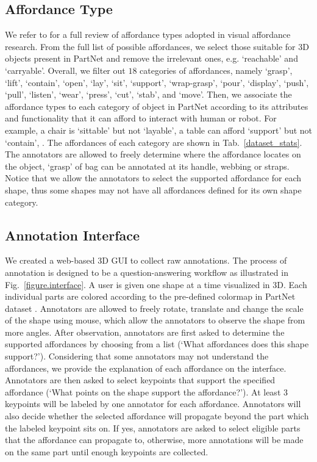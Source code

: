 \documentclass[final]{cvpr}
\begin{document}
 

\subsection{Affordance Type}
We refer to \cite{hassanin2018visual} for a full review of affordance types adopted in visual affordance research. From the full list of possible affordances, we select those suitable for 3D objects present in PartNet \cite{mo2019partnet} and remove the irrelevant ones, e.g. `reachable' and `carryable'. Overall, we filter out $18$ categories of affordances, namely `grasp', `lift', `contain', `open', `lay', `sit', `support', `wrap-grasp', `pour', `display', `push', `pull', `listen', `wear', `press', `cut', `stab', and `move'. Then, we associate the affordance types to each category of object in PartNet according to its attributes and functionality that it can afford to interact with human or robot. For example, a chair is `sittable' but not `layable', a table can afford `support' but not `contain', \etc. The affordances of each category are shown in Tab.~\ref{dataset_stats}. The annotators are allowed to freely determine where the affordance locates on the object, \eg `grasp' of bag can be annotated at its handle, webbing or straps. Notice that we allow the annotators to select the supported affordance for each shape, thus some shapes may not have all affordances defined for its own shape category. 





\subsection{Annotation Interface}

We created a web-based 3D GUI to collect raw annotations. The process of annotation is designed to be a question-answering workflow as illustrated in Fig.~\ref{figure.interface}. A user is given one shape at a time visualized in 3D. Each individual parts are colored according to the pre-defined colormap in PartNet dataset \cite{mo2019partnet}. Annotators are allowed to freely rotate, translate and change the scale of the shape
using mouse, which allow the annotators to observe the shape from more angles. After observation, annotators are first asked to determine the supported affordances by choosing from a list (`What affordances does this shape support?'). Considering that some
annotators may not understand the affordances, we provide the explanation of
each affordance on the interface. Annotators are then asked to select keypoints that support the specified affordance (`What points on the shape support the affordance?'). At least 3 keypoints will be labeled by one annotator for each affordance. Annotators will also decide whether the selected affordance will propagate beyond the part which the labeled keypoint sits on. If yes, annotators are asked to select eligible parts that the affordance can propagate to, otherwise, more annotations will be made on the same part until enough keypoints are collected.
\end{document}
